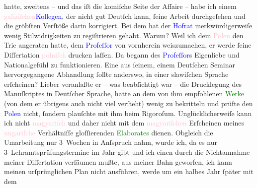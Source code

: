                     hatte, zweitens – und das iſt die komiſche Seite der Affaire – habe ich einem
                        \textcolor{pink}{galiziſchen}{}\ledrightnote{\textcolor{pink}{Galizien}}{ }\textcolor{blue}{Kollegen}{}, der nicht gut
                    Deutſch kann, ſeine Arbeit durchgeſehen und die gröbſten Verſtöße darin
                    korrigiert. Bei dem hat der \textcolor{blue}{Hofrat}{} merkwürdigerweiſe wenig Stilwidrigkeiten zu regiſtrieren
                    gehabt. Warum? Weil ich dem \textcolor{pink}{Polen}{}\ledrightnote{\textcolor{pink}{Polen}} den Tric
                    angeraten hatte, dem \textcolor{blue}{Profeſſor}{} von vornherein weiszumachen, er werde ſeine Diſſertation \textcolor{pink}{polniſch}{}\ledrightnote{\textcolor{pink}{Polen}} drucken laſſen. Da begann des \textcolor{blue}{Profeſſor}{}s Eigenliebe und
                    Nationalgefühl zu funktionieren. Eine aus ſeinem, einem Deutſchen Seminar
                    hervorgegangene Abhandlung ſollte anderswo, in einer slawiſchen Sprache
                    erſcheinen? Lieber veranlaßte er – was beabſichtigt war – die Drucklegung des
                    Manuſkriptes in Deutſcher Sprache, {\pb}hatte an dem von ihm empfohlenen \textcolor{green}{Werke}{} (von dem er übrigens auch nicht viel verſteht)
                    wenig zu bekritteln und prüfte den \textcolor{blue}{Polen}{} nicht, ſondern plauſchte mit ihm beim
                    Rigoroſum. Unglücklicherweiſe kann ich nicht \textcolor{pink}{magyariſch}{}\ledrightnote{\textcolor{pink}{Ungarn}} und daher nicht mit dem \textcolor{pink}{magyariſchen}{}\ledrightnote{\textcolor{pink}{Ungarn}} Erſcheinen meines \textcolor{pink}{ungariſche}{}\ledrightnote{\textcolor{pink}{Ungarn}} Verhältniſſe gloſſierenden \textcolor{green}{Elaborates}{} dienen.\pend
           \pstart
           Obgleich die Umarbeitung nur 3 Wochen in Anſspruch nahm, wurde ich, da es nur
                    3 Lehramtsprüfungstermine im Jahr gibt und ich einen durch die Nichtannahme
                    meiner Diſſertation verſäumen mußte, aus meiner Bahn geworfen, ich kann meinen
                    urſprünglichen Plan nicht ausführen, werde um ein halbes Jahr ſpäter mit dem
